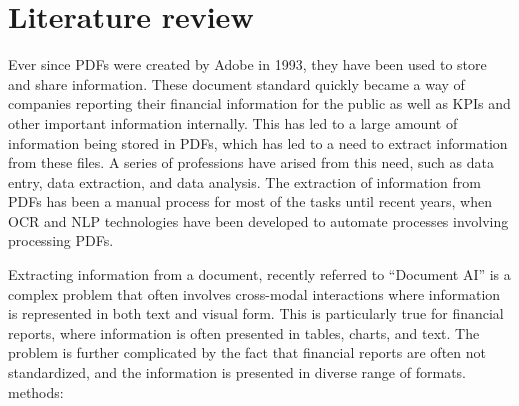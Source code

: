\documentclass[english, 12pt, a4paper, elec, utf8, a-2b, online]{aaltothesis}
\begin{document}

\clearpage

\section{Literature review}

Ever since \ac{PDFs} were created by Adobe in 1993, they have been used to store and share information. These document standard quickly became a way of companies reporting their financial information for the public as well as \ac{KPI}s and other important information internally. This has led to a large amount of information being stored in \ac{PDFs}, which has led to a need to extract information from these files. A series of professions have arised from this need, such as data entry, data extraction, and data analysis. The extraction of information from \ac{PDFs} has been a manual process for most of the tasks until recent years, when \ac{OCR} and \ac{NLP} technologies have been developed to automate processes involving processing \ac{PDFs}.

Extracting information from a document, recently referred to ``Document AI'' is a complex problem that often involves cross-modal interactions where information is represented in both text and visual form. This is particularly true for financial reports, where information is often presented in tables, charts, and text. The problem is further complicated by the fact that financial reports are often not standardized, and the information is presented in diverse range of formats.
%
methods:
\end{document}
